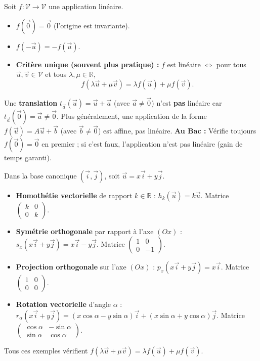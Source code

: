 \documentclass[11pt]{article}
\newcommand{\cle}[1]{{\popxbold\color{popdark}#1}}
\begin{document}
\begin{propriete}
Soit $f : \mathcal{V} \to \mathcal{V}$ une application linéaire.
\begin{itemize}
  \item $f(\vec{0}) = \vec{0}$ (l'origine est invariante).
  \item $f(-\vec{u}) = -f(\vec{u})$.
  \item \textbf{Critère unique (souvent plus pratique) :} $f$ est linéaire $\iff$ pour tous $\vec{u}, \vec{v} \in \mathcal{V}$ et tous $\lambda, \mu \in \mathbb{R}$,
  \[ f(\lambda \vec{u} + \mu \vec{v}) = \lambda f(\vec{u}) + \mu f(\vec{v}). \]
\end{itemize}
\end{propriete}

\begin{attention}
Une \textbf{translation} $t_{\vec{a}}(\vec{u}) = \vec{u} + \vec{a}$ (avec $\vec{a} \neq \vec{0}$) n'est \textbf{pas} linéaire car $t_{\vec{a}}(\vec{0}) = \vec{a} \neq \vec{0}$.
Plus généralement, une application de la forme $f(\vec{u}) = A\vec{u} + \vec{b}$ (avec $\vec{b} \neq \vec{0}$) est \cle{affine}, pas linéaire. \textbf{Au Bac :} Vérifie toujours $f(\vec{0})=\vec{0}$ en premier ; si c'est faux, l'application n'est pas linéaire (gain de temps garanti).
\end{attention}

\begin{exemplebox}
Dans la base canonique $(\vec{i}, \vec{j})$, soit $\vec{u} = x\vec{i} + y\vec{j}$.
\begin{itemize}
  \item \textbf{Homothétie vectorielle} de rapport $k \in \mathbb{R}$ : $h_k(\vec{u}) = k\vec{u}$. Matrice $\begin{pmatrix} k & 0 \\ 0 & k \end{pmatrix}$.
  \item \textbf{Symétrie orthogonale} par rapport à l'axe $(Ox)$ : $s_x(x\vec{i}+y\vec{j}) = x\vec{i} - y\vec{j}$. Matrice $\begin{pmatrix} 1 & 0 \\ 0 & -1 \end{pmatrix}$.
  \item \textbf{Projection orthogonale} sur l'axe $(Ox)$ : $p_x(x\vec{i}+y\vec{j}) = x\vec{i}$. Matrice $\begin{pmatrix} 1 & 0 \\ 0 & 0 \end{pmatrix}$.
  \item \textbf{Rotation vectorielle} d'angle $\alpha$ : $r_\alpha(x\vec{i}+y\vec{j}) = (x\cos\alpha - y\sin\alpha)\vec{i} + (x\sin\alpha + y\cos\alpha)\vec{j}$. Matrice $\begin{pmatrix} \cos\alpha & -\sin\alpha \\ \sin\alpha & \cos\alpha \end{pmatrix}$.
\end{itemize}
Tous ces exemples vérifient $f(\lambda\vec{u}+\mu\vec{v}) = \lambda f(\vec{u})+\mu f(\vec{v})$.
\end{exemplebox}
\end{document}
